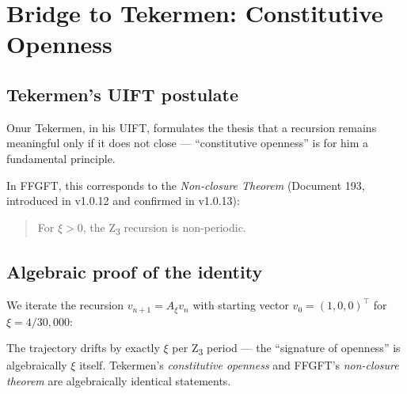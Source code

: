 \section{Bridge to Tekermen: Constitutive Openness}
\label{sec:tekermen}

\subsection{Tekermen's UIFT postulate}

Onur Tekermen, in his UIFT, formulates the thesis that a recursion remains meaningful only if it does not close --- ``constitutive openness'' is for him a fundamental principle.

In FFGFT, this corresponds to the \emph{Non-closure Theorem} (Document 193, introduced in v1.0.12 and confirmed in v1.0.13):
\begin{quote}
For \(\xi > 0\), the Z\textsubscript{3} recursion is non-periodic.
\end{quote}

\subsection{Algebraic proof of the identity}

We iterate the recursion \(v_{n+1} = A_\xi v_n\) with starting vector \(v_0 = (1, 0, 0)^\top\) for \(\xi = 4/30{,}000\):

\begin{table}[h]
\centering
\caption{Trajectories of the Z\textsubscript{3} recursion: unperturbed vs.~perturbed}
\end{table}

\begin{keyresult}
The trajectory drifts by exactly \(\xi\) per Z\textsubscript{3} period --- the ``signature of openness'' is algebraically \(\xi\) itself. Tekermen's \emph{constitutive openness} and FFGFT's \emph{non-closure theorem} are algebraically identical statements.
\end{keyresult}

